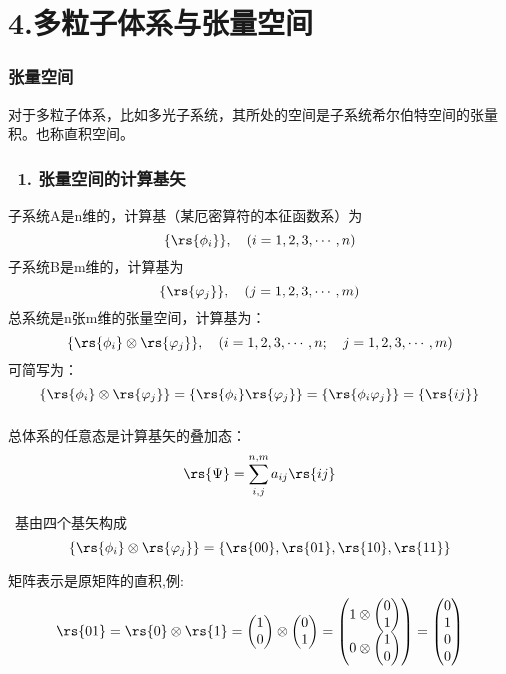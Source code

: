 \section{4.多粒子体系与张量空间}

\begin{frame}
    \frametitle{张量空间}
    \begin{tcolorbox4}[张量积]
    对于多粒子体系，比如多光子系统，其所处的空间是子系统希尔伯特空间的张量积。也称直积空间。
    \end{tcolorbox4}
\end{frame}

\begin{frame}
    \frametitle{~1. 张量空间的计算基矢}
    子系统A是n维的，计算基（某厄密算符的本征函数系）为$$\{\rs{\phi_i}\},\quad (i=1,2,3,\cdots,n)$$ 
    子系统B是m维的，计算基为$$\{\rs{\varphi_j}\},\quad (j=1,2,3,\cdots,m)$$ 
    总系统是n张m维的张量空间，计算基为：$$\{\rs{\phi_i}\otimes\rs{\varphi_j}\},\quad (i=1,2,3,\cdots,n;\quad j=1,2,3,\cdots,m)$$ 
    可简写为：$$\{\rs{\phi_i}\otimes\rs{\varphi_j}\}=\{\rs{\phi_i}\rs{\varphi_j}\}=\{\rs{\phi_i\varphi_j}\}=\{\rs{ij}\}$$
\end{frame}

\begin{frame}
    \frametitle{}
    总体系的任意态是计算基矢的叠加态：
    \[ \rs{\Psi} = \sum_{i,j} ^{n,m} a_{ij}\rs{ij}\] \vspace{0.6em}

    \例[7. 写出$C^2$空间的张量空间的计算基]{} 
    \解~基由四个基矢构成$$\{\rs{\phi_i}\otimes\rs{\varphi_j}\}=\{\rs{00},\rs{01},\rs{10},\rs{11}\}$$

矩阵表示是原矩阵的直积,例: 
\[\rs{01} = \rs{0} \otimes \rs{1} =    
\begin{pmatrix}
    1\\
    0
\end{pmatrix}
\otimes
\begin{pmatrix}
    0\\
    1
\end{pmatrix}
=
\begin{pmatrix}
    1 \otimes \begin{pmatrix}
        0\\
        1
    \end{pmatrix}\\
    0 \otimes \begin{pmatrix}
        1\\
        0
    \end{pmatrix}
\end{pmatrix}
=
\begin{pmatrix}
    0\\
    1\\
    0\\
    0
\end{pmatrix}
 \] 
\end{frame}

